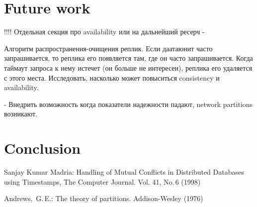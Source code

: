\documentclass{llncs}
\begin{document}
\section{Future work}
!!!! Отдельная секция про availability или на дальнейший ресерч -

Алгоритм распространения-очищения реплик. Если даатаюнит часто запрашивается, то реплика его появляется там, где он часто запрашивается. Когда таймаут запроса к нему истечет (он больше не интересен), реплика его удаляется с этого места.
Исследовать, насколько может повыситься consistency и availability.

- Внедрить возможность когда показатели надежности падают, network partitions возникают.


\section{Conclusion}

\begin{thebibliography}{00}

Sanjay Kumar Madria: 
Handling of Mutual Conflicts in Distributed Databases using Timestamps,
The Computer Journal. Vol. 41, No.\,6 (1998) 

Andrews,~G.\,E.:
The theory of partitions.
Addison-Wesley (1976)
\end{thebibliography}
\end{document}
